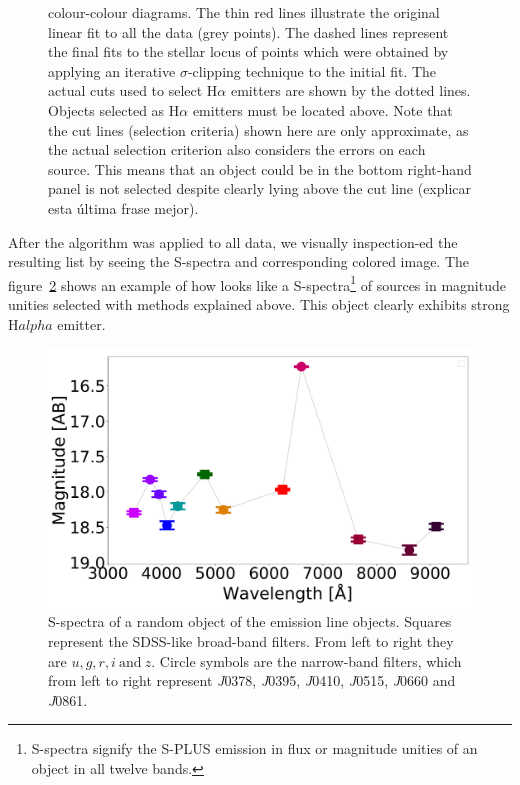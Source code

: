 \documentclass[fleqn,usenatbib]{mnras}
\begin{document}
\begin{figure}
{    colour-colour diagrams. The thin red lines illustrate the original linear
    fit to all the data (grey points). The dashed lines represent the final
    fits to the stellar locus of points which were obtained by applying an iterative
    $\sigma$-clipping technique to the initial fit. The actual cuts used to select
    H{$\alpha$} emitters are shown by the dotted lines. Objects selected as H{$\alpha$}
    emitters must be located above. Note that the cut lines (selection criteria) shown
    here are only approximate, as the actual selection criterion also considers the
    errors on each source. This means that an object could be in the bottom
    right-hand panel is not selected despite clearly lying above the cut line
    ({\sc explicar esta última frase mejor}).}
  \label{fig:criteria-color-plot}
\end{figure}

After the algorithm was applied to all data, we visually inspection-ed the
resulting list by seeing the S-spectra and corresponding colored image.
The figure~\ref{fig:Spectra} shows an example of how looks like a
S-spectra\footnote{S-spectra signify the S-PLUS emission in flux
or magnitude unities of an object in all twelve bands.} of sources in
magnitude unities selected with methods explained above. This object
clearly exhibits strong H$alpha$ emitter.

\begin{figure}
\includegraphics[width=0.9\linewidth]{Figs/photopectrum_splus_HYDRA-0026-052331_Good-LD-Halpha-DR3_noFlag_merge-takeoutbad-Final_PStotal.pdf}
\centering
{}
\caption{S-spectra of a random object of the emission line objects. Squares represent
  the SDSS-like broad-band filters. From left to right they are \(u, g, r,
  i~\text{and}~ z\). Circle symbols are the narrow-band filters, which from
  left to right represent \textit{J}0378, \textit{J}0395, \textit{J}0410,
  \textit{J}0515, \textit{J}0660 and \textit{J}0861.}
\label{fig:Spectra}
\end{figure}
\end{document}
